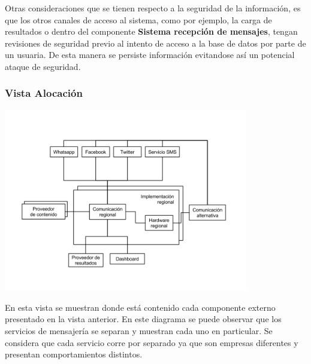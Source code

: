 \documentclass[a4paper, 11pt]{article}
\begin{document}
Otras consideraciones que se tienen respecto a la seguridad de la información, es que los otros canales de acceso al sistema, como por ejemplo, la carga de resultados o dentro del componente \textbf{Sistema recepción de mensajes}, tengan revisiones de seguridad previo al intento de acceso a la base de datos por parte de un usuaria. De esta manera se persiste información evitandose así un potencial ataque de seguridad.\\


\newpage
\subsubsection{Vista Alocación}

\centerline{\includegraphics[width=0.8\textwidth]{./diagramas/VistaAlocacion.png}}

En esta vista se muestran donde está contenido cada componente externo presentado en la vista anterior. En este diagrama se puede observar que los servicios de mensajería se separan y muestran cada uno en particular. Se considera que cada servicio corre por separado ya que son empresas diferentes y presentan comportamientos distintos.\\
\end{document}
